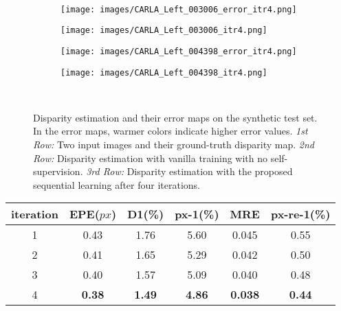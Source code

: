 \documentclass[10pt,twocolumn,letterpaper]{article}
\begin{document}
\begin{figure}[tbp]
	\\\begin{minipage}[c]{0.985\linewidth}
		\begin{subfigure}[c]{.239\linewidth}
			\texttt{[image: images/CARLA\_Left\_003006\_error\_itr4.png]}
			\vspace*{-0.38cm}
		\end{subfigure}	
		\begin{subfigure}[c]{.239\linewidth}
			\texttt{[image: images/CARLA\_Left\_003006\_itr4.png]}
			\vspace*{-0.38cm}		
		\end{subfigure}
		\begin{subfigure}[c]{.239\linewidth}
			\texttt{[image: images/CARLA\_Left\_004398\_error\_itr4.png]}
			\vspace*{-0.38cm}
		\end{subfigure}	
		\begin{subfigure}[c]{.239\linewidth}
			\texttt{[image: images/CARLA\_Left\_004398\_itr4.png]}
			\vspace*{-0.38cm}		
		\end{subfigure}
	\end{minipage}	\\\vspace{-0.3cm}
	\caption{Disparity estimation and their error maps on the synthetic test set. In the error maps, warmer colors indicate higher error values. \emph{1st Row:} Two input images and their ground-truth disparity map. \emph{2nd Row:} Disparity estimation with vanilla training with no self-supervision. \emph{3rd Row:} Disparity estimation with the proposed sequential learning after four iterations.} 
	\label{fig:final}
\end{figure} \begin{table}[tbp]
	\begin{center}
		\footnotesize
		\begin{tabular}{@{\hskip1pt}c@{\hskip1pt}|@{\hskip1pt}c@{\hskip1pt}|@{\hskip1pt}c@{\hskip1pt}|@{\hskip1pt}c@{\hskip1pt}|@{\hskip1pt}c@{\hskip1pt}|@{\hskip1pt}c@{\hskip1pt}}
			\hline				
			iteration &    \hspace{0.1cm}EPE($px$) & \hspace{0.1cm}D1(\%) &\hspace{0.1cm}px-1(\%) &  \hspace{0.1cm}MRE & \hspace{0.1cm}px-re-1(\%) \\ \hline
			1 &   0.43  &  1.76  &    5.60   &   0.045   &  0.55  \\
			2 &   0.41  &  1.65  &    5.29   &   0.042   &  0.50  \\ 
			3 &   0.40  &  1.57  &    5.09   &   0.040   &  0.48       \\
			4 &   \textbf{0.38}     &   \textbf{1.49}      &  \textbf{4.86}   &  \textbf{0.038}    &  \textbf{0.44}       \\ \hline
			

\end{tabular}
\end{center}
\end{table}
\end{document}
